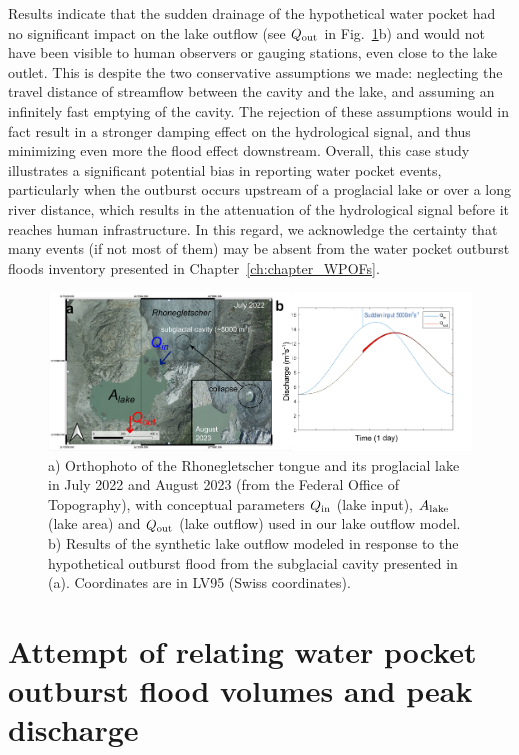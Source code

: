 Results indicate that the sudden drainage of the hypothetical water pocket had no significant impact on the lake outflow (see $Q_{\rm out}$ in Fig.~\ref{fig:WP_rhone}b) and would not have been visible to human observers or gauging stations, even close to the lake outlet. This is despite the two conservative assumptions we made: neglecting the travel distance of streamflow between the cavity and the lake, and assuming an infinitely fast emptying of the cavity. The rejection of these assumptions would in fact result in a stronger damping effect on the hydrological signal, and thus minimizing even more the flood effect downstream. 
Overall, this case study illustrates a significant potential bias in reporting water pocket events, particularly when the outburst occurs upstream of a proglacial lake or over a long river distance, which results in the attenuation of the hydrological signal before it reaches human infrastructure. In this regard, we acknowledge the certainty that many events (if not most of them) may be absent from the water pocket outburst floods inventory presented in Chapter~\ref{ch:chapter_WPOFs}. 


\begin{figure}[h]
    \centering
    \includegraphics[width=1\textwidth]{chapters/Discussion/WP_rhone.pdf}
    \caption{a) Orthophoto of the Rhonegletscher tongue and its proglacial lake in July 2022 and August 2023 (from the Federal Office of Topography), with conceptual parameters $Q_{\rm in}$ (lake input), $A_{\rm lake}$ (lake area) and $Q_{\rm out}$ (lake outflow) used in our lake outflow model. b) Results of the synthetic lake outflow modeled in response to the hypothetical outburst flood from the subglacial cavity presented in (a). Coordinates are in LV95 (Swiss coordinates).}
    \label{fig:WP_rhone}
\end{figure}

\section{ Attempt of relating water pocket outburst flood volumes and peak discharge}
\label{sec:discussion_prediction}

